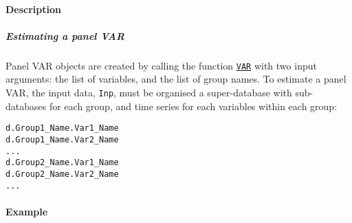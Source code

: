\paragraph{Description}\label{description}

\subparagraph{Estimating a panel VAR}\label{estimating-a-panel-var}

Panel VAR objects are created by calling the function
\href{VAR/VAR}{\texttt{VAR}} with two input arguments: the list of
variables, and the list of group names. To estimate a panel VAR, the
input data, \texttt{Inp}, must be organised a super-database with
sub-databases for each group, and time series for each variables within
each group:

\begin{verbatim}
d.Group1_Name.Var1_Name
d.Group1_Name.Var2_Name
...
d.Group2_Name.Var1_Name
d.Group2_Name.Var2_Name
...
\end{verbatim}

\paragraph{Example}\label{example}


